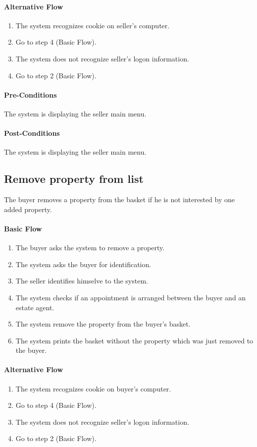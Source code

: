 \documentclass[a4paper,12pt]{article}
\begin{document}
\paragraph{Alternative Flow}
\begin{enumerate}
\item The system recognizes cookie on seller's computer. 
\item Go to step 4 (Basic Flow).
\item The system does not recognize seller's logon information.
\item Go to step 2 (Basic Flow).
\end{enumerate}
\paragraph{Pre-Conditions}
The system is displaying the seller main menu.
\paragraph{Post-Conditions}
The system is displaying the seller main menu.

\subsection{Remove property from list}

The buyer removes a property from the basket if he is not interested by one added property.

\paragraph{Basic Flow}
\begin{enumerate}
\item The buyer asks the system to remove a property.
\item The system asks the buyer for identification.
\item The seller identifies himselve to the system.
\item The system checks if an appointment is arranged between the buyer and an estate agent.
\item The system remove the property from the buyer's basket.
\item The system prints the basket without the property which was just removed to the buyer.
\end{enumerate}
\paragraph{Alternative Flow}
\begin{enumerate}
\item The system recognizes cookie on buyer's computer. 
\item Go to step 4 (Basic Flow).
\item The system does not recognize seller's logon information.
\item Go to step 2 (Basic Flow).
\end{enumerate}
\end{document}
